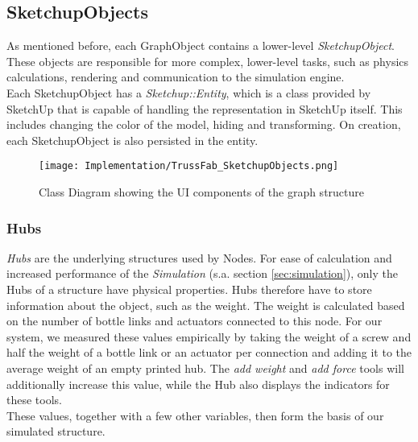 \subsection{SketchupObjects}
As mentioned before, each GraphObject contains a lower-level \textit{SketchupObject}. These objects are responsible for more complex, lower-level tasks, such as physics calculations, rendering and communication to the simulation engine.\\
Each SketchupObject has a \textit{Sketchup::Entity}, which is a class provided by SketchUp that is capable of handling the representation in SketchUp itself. This includes changing the color of the model, hiding and transforming. On creation, each SketchupObject is also persisted in the entity.
\begin{figure}[h!]
    \texttt{[image: Implementation/TrussFab\_SketchupObjects.png]}
    \centering
    \caption{Class Diagram showing the UI components of the graph structure}
    \label{fig:sketchup_objects}
\end{figure}

\subsubsection{Hubs}
\textit{Hubs} are the underlying structures used by Nodes. For ease of calculation and increased performance of the \textit{Simulation} (s.a. section \ref{sec:simulation}), only the Hubs of a structure have physical properties. Hubs therefore have to store information about the object, such as the weight. The weight is calculated based on the number of bottle links and actuators connected to this node. For our system, we measured these values empirically by taking the weight of a screw and half the weight of a bottle link or an actuator per connection and adding it to the average weight of an empty printed hub. The \textit{add weight} and \textit{add force} tools will additionally increase this value, while the Hub also displays the indicators for these tools.\\
These values, together with a few other variables, then form the basis of our simulated structure.

